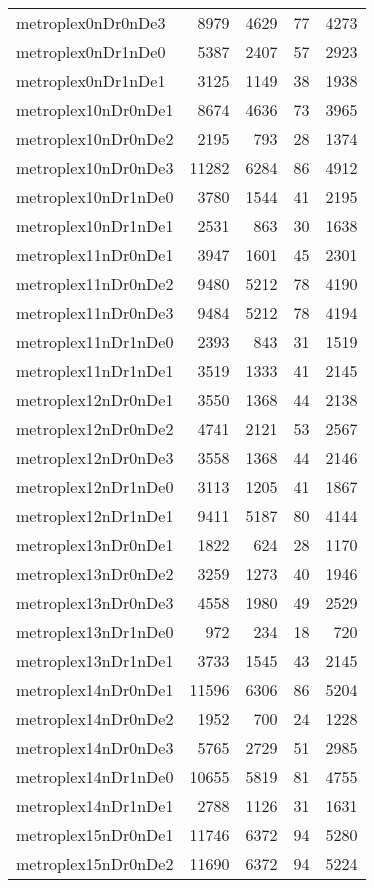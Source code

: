 \documentclass[../../../thesis.tex]{subfiles}
\begin{document}
\begin{longtable}{lrrrr}
metroplex0nDr0nDe3 & 8979 & 4629 & 77 & 4273 \\
metroplex0nDr1nDe0 & 5387 & 2407 & 57 & 2923 \\
metroplex0nDr1nDe1 & 3125 & 1149 & 38 & 1938 \\
metroplex10nDr0nDe1 & 8674 & 4636 & 73 & 3965 \\
metroplex10nDr0nDe2 & 2195 & 793 & 28 & 1374 \\
metroplex10nDr0nDe3 & 11282 & 6284 & 86 & 4912 \\
metroplex10nDr1nDe0 & 3780 & 1544 & 41 & 2195 \\
metroplex10nDr1nDe1 & 2531 & 863 & 30 & 1638 \\
metroplex11nDr0nDe1 & 3947 & 1601 & 45 & 2301 \\
metroplex11nDr0nDe2 & 9480 & 5212 & 78 & 4190 \\
metroplex11nDr0nDe3 & 9484 & 5212 & 78 & 4194 \\
metroplex11nDr1nDe0 & 2393 & 843 & 31 & 1519 \\
metroplex11nDr1nDe1 & 3519 & 1333 & 41 & 2145 \\
metroplex12nDr0nDe1 & 3550 & 1368 & 44 & 2138 \\
metroplex12nDr0nDe2 & 4741 & 2121 & 53 & 2567 \\
metroplex12nDr0nDe3 & 3558 & 1368 & 44 & 2146 \\
metroplex12nDr1nDe0 & 3113 & 1205 & 41 & 1867 \\
metroplex12nDr1nDe1 & 9411 & 5187 & 80 & 4144 \\
metroplex13nDr0nDe1 & 1822 & 624 & 28 & 1170 \\
metroplex13nDr0nDe2 & 3259 & 1273 & 40 & 1946 \\
metroplex13nDr0nDe3 & 4558 & 1980 & 49 & 2529 \\
metroplex13nDr1nDe0 & 972 & 234 & 18 & 720 \\
metroplex13nDr1nDe1 & 3733 & 1545 & 43 & 2145 \\
metroplex14nDr0nDe1 & 11596 & 6306 & 86 & 5204 \\
metroplex14nDr0nDe2 & 1952 & 700 & 24 & 1228 \\
metroplex14nDr0nDe3 & 5765 & 2729 & 51 & 2985 \\
metroplex14nDr1nDe0 & 10655 & 5819 & 81 & 4755 \\
metroplex14nDr1nDe1 & 2788 & 1126 & 31 & 1631 \\
metroplex15nDr0nDe1 & 11746 & 6372 & 94 & 5280 \\
metroplex15nDr0nDe2 & 11690 & 6372 & 94 & 5224 \\

\end{longtable}
\end{document}

